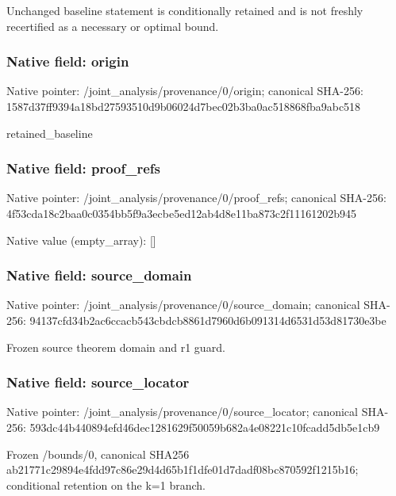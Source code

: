 \documentclass[10pt,a4paper]{article}
\begin{document}
\begingroup\raggedright\sloppy Unchanged baseline statement is conditionally retained and is not freshly recertified as a necessary or optimal bound.\par\endgroup

\subsubsection{Native field: origin}
Native pointer: /joint\_\allowbreak{}analysis/provenance/0/origin; canonical SHA-256: 1587d37ff9394a18bd27593510d9b06024d7bec02b3ba0ac518868fba9abc518

\begingroup\raggedright\sloppy retained\_\allowbreak{}baseline\par\endgroup

\subsubsection{Native field: proof\_\allowbreak{}refs}
Native pointer: /joint\_\allowbreak{}analysis/provenance/0/proof\_\allowbreak{}refs; canonical SHA-256: 4f53cda18c2baa0c0354bb5f9a3ecbe5ed12ab4d8e11ba873c2f11161202b945

Native value (empty\_\allowbreak{}array): []

\subsubsection{Native field: source\_\allowbreak{}domain}
Native pointer: /joint\_\allowbreak{}analysis/provenance/0/source\_\allowbreak{}domain; canonical SHA-256: 94137cfd34b2ac6ccacb543cbdcb8861d7960d6b091314d6531d53d81730e3be

\begingroup\raggedright\sloppy Frozen source theorem domain and r1 guard.\par\endgroup

\subsubsection{Native field: source\_\allowbreak{}locator}
Native pointer: /joint\_\allowbreak{}analysis/provenance/0/source\_\allowbreak{}locator; canonical SHA-256: 593dc44b440894efd46dec1281629f50059b682a4e08221c10fcadd5db5e1cb9

\begingroup\raggedright\sloppy Frozen /\allowbreak{}bounds/\allowbreak{}0,\allowbreak{} canonical SHA256 ab21771c29894e4fdd97c86e29d4d65b1f1dfe01d7dadf08bc870592f1215b16;\allowbreak{} conditional retention on the k=\allowbreak{}1 branch.\par\endgroup
\end{document}
